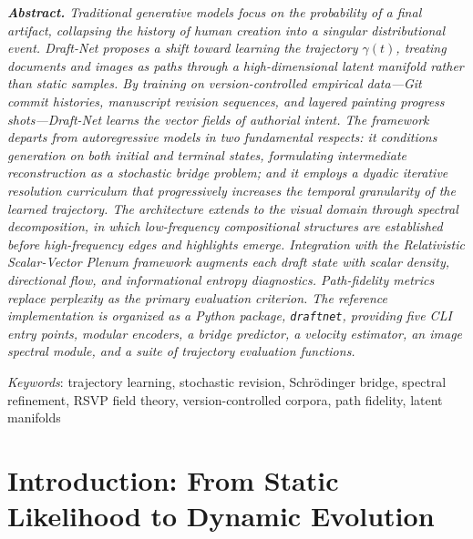 \documentclass[12pt,a4paper]{article}
\theoremstyle{draftthm}
\newcommand{\traj}{\gamma}
\begin{document}
\begin{titlepage}
\vspace{1.4cm}
\begin{minipage}{0.88\textwidth}
\small\itshape\color{draftgray}
\textbf{Abstract.}\quad
Traditional generative models focus on the probability of a final artifact, collapsing the history of human creation into a singular distributional event. Draft-Net proposes a shift toward learning the trajectory $\traj(t)$, treating documents and images as paths through a high-dimensional latent manifold rather than static samples. By training on version-controlled empirical data---Git commit histories, manuscript revision sequences, and layered painting progress shots---Draft-Net learns the vector fields of authorial intent. The framework departs from autoregressive models in two fundamental respects: it conditions generation on both initial and terminal states, formulating intermediate reconstruction as a stochastic bridge problem; and it employs a dyadic iterative resolution curriculum that progressively increases the temporal granularity of the learned trajectory. The architecture extends to the visual domain through spectral decomposition, in which low-frequency compositional structures are established before high-frequency edges and highlights emerge. Integration with the Relativistic Scalar-Vector Plenum framework augments each draft state with scalar density, directional flow, and informational entropy diagnostics. Path-fidelity metrics replace perplexity as the primary evaluation criterion. The reference implementation is organized as a Python package, \texttt{draftnet}, providing five CLI entry points, modular encoders, a bridge predictor, a velocity estimator, an image spectral module, and a suite of trajectory evaluation functions.
\end{minipage}

\vspace{1.0cm}
{\small\color{draftgray}
\textit{Keywords}: trajectory learning, stochastic revision, Schrödinger bridge, spectral refinement,
RSVP field theory, version-controlled corpora, path fidelity, latent manifolds}
\end{titlepage}

\tableofcontents
\newpage

\section{Introduction: From Static Likelihood to Dynamic Evolution}
\end{document}
